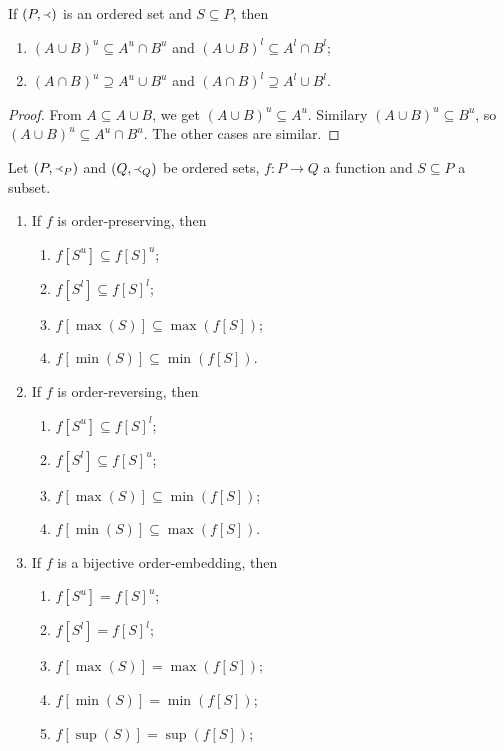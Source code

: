 \begin{corollary}
If $\left( P, \Yleft \right)$ is an ordered set and $S\subseteq P$, then
\begin{enumerate}
\item $(A\cup B)^u \subseteq A^u\cap B^u$ and $(A\cup B)^l \subseteq A^l\cap B^l$;
\item $(A\cap B)^u \supseteq A^u\cup B^u$ and $(A\cap B)^l \supseteq A^l\cup B^l$.
\end{enumerate}
\end{corollary}
\begin{proof}
From $A\subseteq A\cup B$, we get $(A\cup B)^u \subseteq A^u$. Similary $(A\cup B)^u \subseteq B^u$, so $(A\cup B)^u \subseteq A^u\cap B^u$. The other cases are similar.
\end{proof}

\begin{lemma} \label{corollary:orderPreservingReversingBounds}
Let $(P, \Yleft_P)$ and $(Q, \Yleft_Q)$ be ordered sets, $f: P\to Q$ a function and $S\subseteq P$ a subset.
\begin{enumerate}
\item If $f$ is order-preserving, then
\begin{enumerate}
\item $f[S^u] \subseteq f[S]^u$;
\item $f[S^l] \subseteq f[S]^l$;
\item $f[\max(S)] \subseteq \max(f[S])$;
\item $f[\min(S)] \subseteq \min(f[S])$.
\end{enumerate}
\item If $f$ is order-reversing, then
\begin{enumerate}
\item $f[S^u] \subseteq f[S]^l$;
\item $f[S^l] \subseteq f[S]^u$;
\item $f[\max(S)] \subseteq \min(f[S])$;
\item $f[\min(S)] \subseteq \max(f[S])$.
\end{enumerate}
\item If $f$ is a bijective order-embedding, then
\begin{enumerate}
\item $f[S^u] = f[S]^u$;
\item $f[S^l] = f[S]^l$;
\item $f[\max(S)] = \max(f[S])$;
\item $f[\min(S)] = \min(f[S])$;
\item $f[\sup(S)] = \sup(f[S])$;

\end{enumerate}
\end{enumerate}
\end{lemma}
